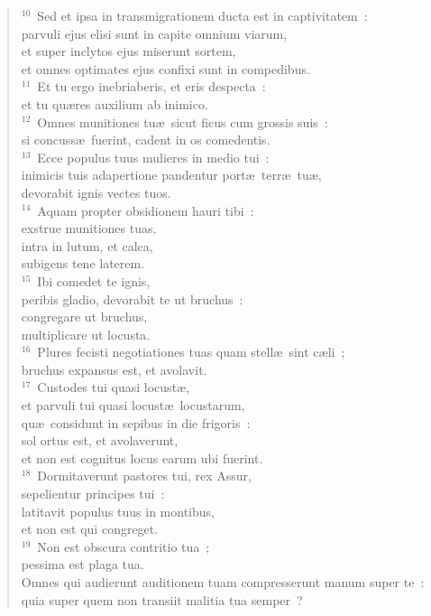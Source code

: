 \begin{flushleft}
\begin{verse}
${}^{10}$~Sed et ipsa in transmigrationem ducta est in captivitatem~:\\ parvuli ejus elisi sunt in capite omnium viarum,\\ et super inclytos ejus miserunt sortem,\\ et omnes optimates ejus confixi sunt in compedibus.\\
${}^{11}$~Et tu ergo inebriaberis, et eris despecta~:\\ et tu qu\ae res auxilium ab inimico.\\
${}^{12}$~Omnes munitiones tu\ae\ sicut ficus cum grossis suis~:\\ si concuss\ae\ fuerint, cadent in os comedentis.\\
${}^{13}$~Ecce populus tuus mulieres in medio tui~:\\ inimicis tuis adapertione pandentur port\ae\ terr\ae\ tu\ae ,\\ devorabit ignis vectes tuos.\\
${}^{14}$~Aquam propter obsidionem hauri tibi~:\\ exstrue munitiones tuas,\\ intra in lutum, et calca,\\ subigens tene laterem.\\
${}^{15}$~Ibi comedet te ignis,\\ peribis gladio, devorabit te ut bruchus~:\\ congregare ut bruchus,\\ multiplicare ut locusta.\\
${}^{16}$~Plures fecisti negotiationes tuas quam stell\ae\ sint c\ae li~;\\ bruchus expansus est, et avolavit.\\
${}^{17}$~Custodes tui quasi locust\ae ,\\ et parvuli tui quasi locust\ae\ locustarum,\\ qu\ae\ considunt in sepibus in die frigoris~:\\ sol ortus est, et avolaverunt,\\ et non est cognitus locus earum ubi fuerint.\\
${}^{18}$~Dormitaverunt pastores tui, rex Assur,\\ sepelientur principes tui~:\\ latitavit populus tuus in montibus,\\ et non est qui congreget.\\
${}^{19}$~Non est obscura contritio tua~;\\ pessima est plaga tua.\\ Omnes qui audierunt auditionem tuam compresserunt manum super te~:\\ quia super quem non transiit malitia tua semper~?\end{verse}\end{flushleft}


